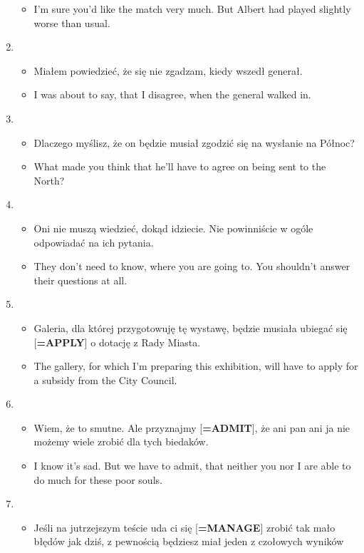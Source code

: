 \documentclass[a4paper]{article}
\begin{document}
\begin{enumerate}
\begin{itemize}
        \item I'm sure you'd like the match very much. But Albert had played slightly worse than usual.
    \end{itemize}
    \item \begin{itemize}
        \item Miałem powiedzieć, że się nie zgadzam, kiedy wszedł generał.
        \item I was about to say, that I disagree, when the general walked in.
    \end{itemize}
    \item \begin{itemize}
        \item Dlaczego myślisz, że on będzie musiał zgodzić się na wysłanie na Północ?
        \item What made you think that he'll have to agree on being sent to the North?
    \end{itemize}
    \item \begin{itemize}
        \item Oni nie muszą wiedzieć, dokąd idziecie. Nie powinniście w ogóle odpowiadać na ich pytania.
        \item They don't need to know, where you are going to. You shouldn't answer their questions at all.
    \end{itemize}
    \item \begin{itemize}
        \item Galeria, dla której przygotowuję tę wystawę, będzie musiała ubiegać się [{\bf=APPLY}] o dotację z Rady Miasta.
        \item The gallery, for which I'm preparing this exhibition, will have to apply for a subsidy from the City Council.
    \end{itemize}
    \item \begin{itemize}
        \item Wiem, że to smutne. Ale przyznajmy [{\bf=ADMIT}], że ani pan ani ja nie możemy wiele zrobić dla tych biedaków.
        \item I know it's sad. But we have to admit, that neither you nor I are able to do much for these poor souls.
    \end{itemize}
    \item \begin{itemize}
        \item Jeśli na jutrzejszym teście uda ci się [{\bf=MANAGE}] zrobić tak mało błędów jak dziś, z pewnością będziesz miał jeden z czołowych wyników

\end{itemize}
\end{enumerate}
\end{document}
